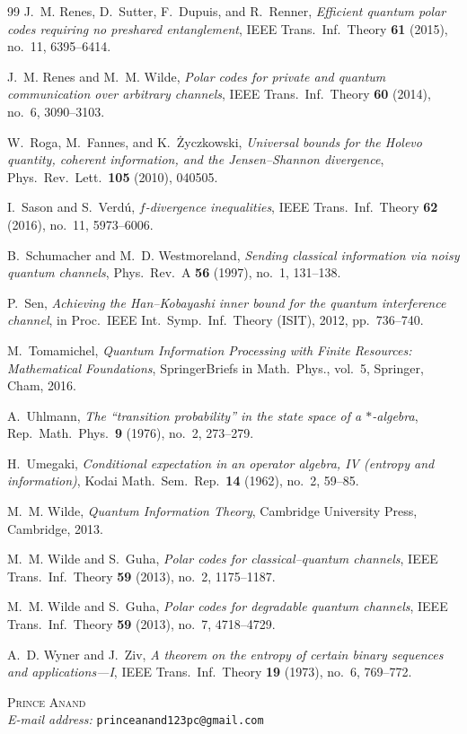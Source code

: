 \documentclass[10pt,a4paper]{article}
\numberwithin{equation}{section}
\theoremstyle{plain}
\theoremstyle{definition}
\theoremstyle{remark}
\begin{document}
\begin{thebibliography}{99}
J.~M. Renes, D.~Sutter, F.~Dupuis, and R.~Renner, \emph{Efficient quantum polar codes requiring no preshared entanglement}, IEEE Trans.\ Inf.\ Theory \textbf{61} (2015), no.~11, 6395--6414.

J.~M. Renes and M.~M. Wilde, \emph{Polar codes for private and quantum communication over arbitrary channels}, IEEE Trans.\ Inf.\ Theory \textbf{60} (2014), no.~6, 3090--3103.

W.~Roga, M.~Fannes, and K.~\.{Z}yczkowski, \emph{Universal bounds for the Holevo quantity, coherent information, and the Jensen--Shannon divergence}, Phys.\ Rev.\ Lett.\ \textbf{105} (2010), 040505.

I.~Sason and S.~Verd\'{u}, \emph{$f$-divergence inequalities}, IEEE Trans.\ Inf.\ Theory \textbf{62} (2016), no.~11, 5973--6006.

B.~Schumacher and M.~D. Westmoreland, \emph{Sending classical information via noisy quantum channels}, Phys.\ Rev.\ A \textbf{56} (1997), no.~1, 131--138.

P.~Sen, \emph{Achieving the Han--Kobayashi inner bound for the quantum interference channel}, in Proc.\ IEEE Int.\ Symp.\ Inf.\ Theory (ISIT), 2012, pp.~736--740.

M.~Tomamichel, \emph{Quantum Information Processing with Finite Resources: Mathematical Foundations}, SpringerBriefs in Math.\ Phys., vol.~5, Springer, Cham, 2016.

A.~Uhlmann, \emph{The ``transition probability'' in the state space of a $*$-algebra}, Rep.\ Math.\ Phys.\ \textbf{9} (1976), no.~2, 273--279.

H.~Umegaki, \emph{Conditional expectation in an operator algebra, IV (entropy and information)}, Kodai Math.\ Sem.\ Rep.\ \textbf{14} (1962), no.~2, 59--85.

M.~M. Wilde, \emph{Quantum Information Theory}, Cambridge University Press, Cambridge, 2013.

M.~M. Wilde and S.~Guha, \emph{Polar codes for classical--quantum channels}, IEEE Trans.\ Inf.\ Theory \textbf{59} (2013), no.~2, 1175--1187.

M.~M. Wilde and S.~Guha, \emph{Polar codes for degradable quantum channels}, IEEE Trans.\ Inf.\ Theory \textbf{59} (2013), no.~7, 4718--4729.

A.~D. Wyner and J.~Ziv, \emph{A theorem on the entropy of certain binary sequences and applications---I}, IEEE Trans.\ Inf.\ Theory \textbf{19} (1973), no.~6, 769--772.

\end{thebibliography}

\bigskip
\noindent\textsc{Prince Anand}\\
\emph{E-mail address:} \texttt{princeanand123pc@gmail.com}
\end{document}
